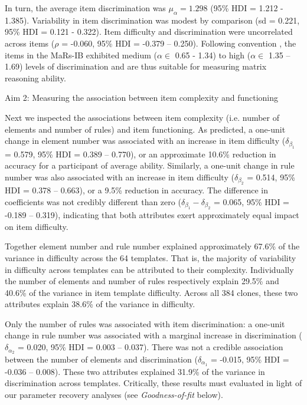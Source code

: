 \documentclass[a4paper,man,natbib,noextraspace]{apa6}
\makeatletter
\renewcommand{\subsubsection}{\@startsection{subsubsection}{3}
  {\z@}%
  {\b@level@two@skip}{\e@level@two@skip}%
  {\normalfont\normalsize\bfseries}}
\makeatother
\begin{document}
In turn, the average item discrimination was $\mu_\alpha = 1.298$ (95\% HDI = 1.212 - 1.385). Variability in item discrimination was modest by comparison (sd = 0.221, 95\% HDI = 0.121 - 0.322). Item difficulty and discrimination were uncorrelated across items ($\rho$ = -0.060, 95\% HDI = -0.379 -- 0.250). Following convention \citep{baker2017basics}, the items in the MaRs-IB exhibited medium ($\alpha \in$ 0.65 - 1.34) to high ($\alpha \in$ 1.35 – 1.69) levels of discrimination and are thus suitable for measuring matrix reasoning ability.

\subsubsection{Aim 2: Measuring the association between item complexity and functioning}

Next we inspected the associations between item complexity (i.e. number of elements and number of rules) and item functioning. As predicted, a one-unit change in element number was associated with an increase in item difficulty ($\delta_{\beta_1}$ = 0.579, 95\% HDI = 0.389 -- 0.770), or an approximate 10.6\% reduction in accuracy for a participant of average ability. Similarly, a one-unit change in rule number was also associated with an increase in item difficulty ($\delta_{\beta_2}$ = 0.514, 95\% HDI = 0.378 -- 0.663), or a 9.5\% reduction in accuracy. The difference in coefficients was not credibly different than zero ($\delta_{\beta_1} - \delta_{\beta_2}$ = 0.065, 95\% HDI = -0.189 -- 0.319), indicating that both attributes exert approximately equal impact on item difficulty.

Together element number and rule number explained approximately 67.6\% of the variance in difficulty across the 64 templates. That is, the majority of variability in difficulty across templates can be attributed to their complexity. Individually the number of elements and number of rules respectively explain 29.5\% and 40.6\% of the variance in item template difficulty. Across all 384 clones, these two attributes explain 38.6\% of the variance in difficulty.

Only the number of rules was associated with item discrimination: a one-unit change in rule number was associated with a marginal increase in discrimination ($\delta_{\alpha_2}$ = 0.020, 95\% HDI = 0.003 -- 0.037). There was not a credible association between the number of elements and discrimination ($\delta_{\alpha_1}$ = -0.015, 95\% HDI = -0.036 -- 0.008). These two attributes explained 31.9\% of the variance in discrimination across templates. Critically, these results must evaluated in light of our parameter recovery analyses (see \textit{Goodness-of-fit} below).
\end{document}
